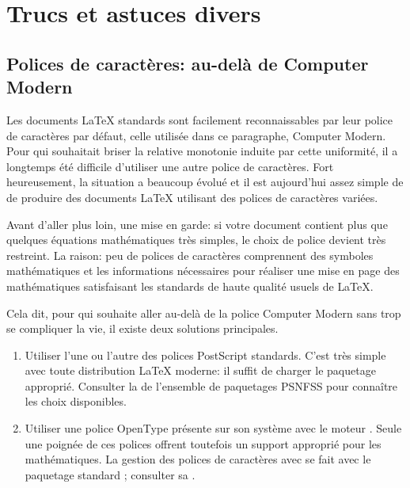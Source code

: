 \chapter{Trucs et astuces divers}
\label{chap:trucs}


\section{Polices de caractères: au-delà de Computer Modern}
\label{sec:trucs:police}

{\selectfont%
  Les documents {\LaTeX} standards sont facilement reconnaissables par
  leur police de caractères par défaut, celle utilisée dans ce
  paragraphe, Computer Modern. Pour qui souhaitait briser la relative
  monotonie induite par cette uniformité, il a longtemps été difficile
  d'utiliser une autre police de caractères. Fort heureusement, la
  situation a beaucoup évolué et il est aujourd'hui assez simple de de
  produire des documents {\LaTeX} utilisant des polices de caractères
  variées.}

Avant d'aller plus loin, une mise en garde: si votre document contient
plus que quelques équations mathématiques très simples, le choix de
police devient très restreint. La raison: peu de polices de caractères
comprennent des symboles mathématiques et les informations nécessaires
pour réaliser une mise en page des mathématiques satisfaisant les
standards de haute qualité usuels de {\LaTeX}.

Cela dit, pour qui souhaite aller au-delà de la police Computer Modern
sans trop se compliquer la vie, il existe deux solutions principales.

\begin{enumerate}
\item Utiliser l'une ou l'autre des polices PostScript standards.
  C'est très simple avec toute distribution {\LaTeX} moderne: il
  suffit de charger le paquetage approprié. Consulter la %
  de l'ensemble de paquetages PSNFSS pour connaître les choix
  disponibles.
\item Utiliser une police OpenType présente sur son système avec le
  moteur {\XeLaTeX}. Seule une poignée de ces polices offrent
  toutefois un support approprié pour les mathématiques. La gestion
  des polices de caractères avec {\XeLaTeX} se fait avec le paquetage
  standard ; consulter sa %
  .
\end{enumerate}

